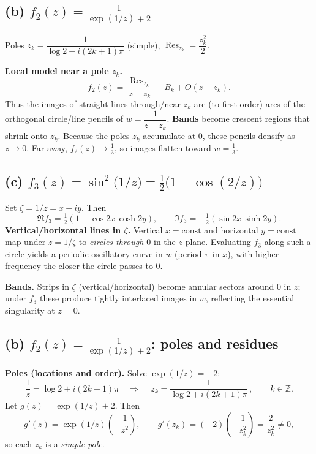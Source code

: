 \documentclass[12pt,a4paper]{article}
\begin{document}
	\bigskip
	
	\subsection*{(b) \(\displaystyle f_2(z)=\frac{1}{\exp(1/z)+2}\)}
	Poles \(z_k=\dfrac{1}{\log 2+i(2k+1)\pi}\) (simple), \(\operatorname{Res}_{z_k}=\dfrac{z_k^2}{2}\).
	
	\textbf{Local model near a pole \(z_k\).} 
	\[
	f_2(z)=\frac{\operatorname{Res}_{z_k}}{z-z_k}+B_k+O(z-z_k).
	\]
	Thus the images of straight lines through/near \(z_k\) are (to first order) arcs of the orthogonal circle/line pencils of \(w=\dfrac{1}{z-z_k}\).  
	\textbf{Bands} become crescent regions that shrink onto \(z_k\).  
	Because the poles \(z_k\) accumulate at \(0\), these pencils densify as \(z\to0\).
	Far away, \(f_2(z)\to\tfrac13\), so images flatten toward \(w=\tfrac13\).
	
	\bigskip
	
	\subsection*{(c) \(\displaystyle f_3(z)=\sin^{2}\!\bigl(1/z\bigr)=\tfrac12\bigl(1-\cos(2/z)\bigr)\)}
	Set \(\zeta=1/z=x+iy\). Then
	\[
	\Re f_3=\tfrac12(1-\cos 2x\,\cosh 2y),\qquad
	\Im f_3=-\tfrac12(\sin 2x\,\sinh 2y).
	\]
	\textbf{Vertical/horizontal lines in \(\zeta\).} Vertical \(x=\text{const}\) and horizontal \(y=\text{const}\) map under \(z=1/\zeta\) to \emph{circles through \(0\)} in the \(z\)-plane.  
	Evaluating \(f_3\) along such a circle yields a periodic oscillatory curve in \(w\) (period \(\pi\) in \(x\)), with higher frequency the closer the circle passes to \(0\).
	
	\textbf{Bands.} Strips in \(\zeta\) (vertical/horizontal) become annular sectors around \(0\) in \(z\); under \(f_3\) these produce tightly interlaced images in \(w\), reflecting the essential singularity at \(z=0\).
	
	\subsection*{(b) \(\displaystyle f_2(z)=\frac{1}{\exp(1/z)+2}\): poles and residues}
	
	\textbf{Poles (locations and order).}
	Solve \(\exp(1/z)=-2\):
	\[
	\frac{1}{z}=\log 2+i(2k+1)\pi
	\quad\Longrightarrow\quad
	\boxed{\,z_k=\dfrac{1}{\log 2+i(2k+1)\pi}\,},\qquad k\in\mathbb Z.
	\]
	Let \(g(z)=\exp(1/z)+2\). Then
	\[
	g'(z)=\exp(1/z)\!\left(-\frac{1}{z^2}\right),\qquad
	g'(z_k)=(-2)\!\left(-\frac{1}{z_k^{2}}\right)=\frac{2}{z_k^{2}}\neq0,
	\]
	so each \(z_k\) is a \emph{simple pole}.
	
\end{document}
